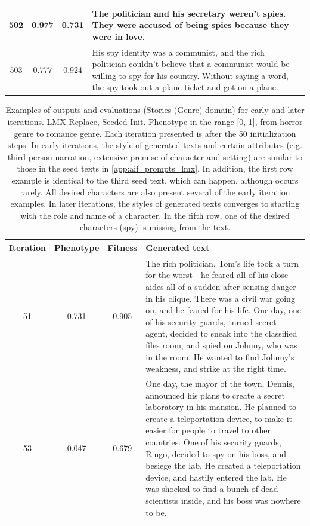 \begin{table}[ht]
\begin{center}
\begin{tabular}{cccp{8.5cm}}
    \midrule
    502 & 0.977 & 0.731 & The politician and his secretary weren’t spies. They were accused of being spies because they were in love. \\
    \midrule
    503 & 0.777 & 0.924 & His spy identity was a communist, and the rich politician couldn’t believe that a communist would be willing to spy for his country. Without saying a word, the spy took out a plane ticket and got on a plane. \\
    \bottomrule
  \end{tabular}
  \end{center}
  \label{app:table_iter_stories_genre_replace_zero}
\end{table}

\begin{table}[ht]
  \caption{Examples of outputs and evaluations (Stories (Genre) domain) for early and later iterations. LMX-Replace, Seeded Init. Phenotype in the range [0, 1], from horror genre to romance genre. Each iteration presented is after the 50 initialization steps. In early iterations, the style of generated texts and certain attributes (e.g. third-person narration, extensive premise of character and setting) are similar to those in the seed texts in \ref{app:aif_prompts_lmx}. In addition, the first row example is identical to the third seed text, which can happen, although occurs rarely. All desired characters are also present several of the early iteration examples. In later iterations, the styles of generated texts converges to starting with the role and name of a character. In the fifth row, one of the desired characters (spy) is missing from the text.}
  \begin{center}
  \small
  \begin{tabular}{cccp{8.5cm}}
    \toprule
    Iteration     & Phenotype  & Fitness     & Generated text \\
    \midrule
    51 &  0.731 & 0.905 &  The rich politician, Tom's life took a turn for the worst - he feared all of his close aides all of a sudden after sensing danger in his clique. There was a civil war going on, and he feared for his life. One day, one of his security guards, turned secret agent, decided to sneak into the classified files room, and spied on Johnny, who was in the room. He wanted to find Johnny's weakness, and strike at the right time. \\
    \midrule
    53 & 0.047 & 0.679 &  One day, the mayor of the town, Dennis, announced his plans to create a secret laboratory in his mansion. He planned to create a teleportation device, to make it easier for people to travel to other countries. One of his security guards, Ringo, decided to spy on his boss, and besiege the lab. He created a teleportation device, and hastily entered the lab. He was shocked to find a bunch of dead scientists inside, and his boss was nowhere to be. \\

\end{tabular}
\end{center}
\end{table}
